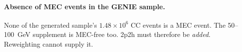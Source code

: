 \paragraph{Absence of MEC events in the GENIE sample.} None of the generated sample's $1.48\times10^{6}$ CC events is a MEC event. The 50--\SI{100}{GeV} supplement is MEC-free too. 2p2h must therefore be \emph{added}. Reweighting cannot supply it.

